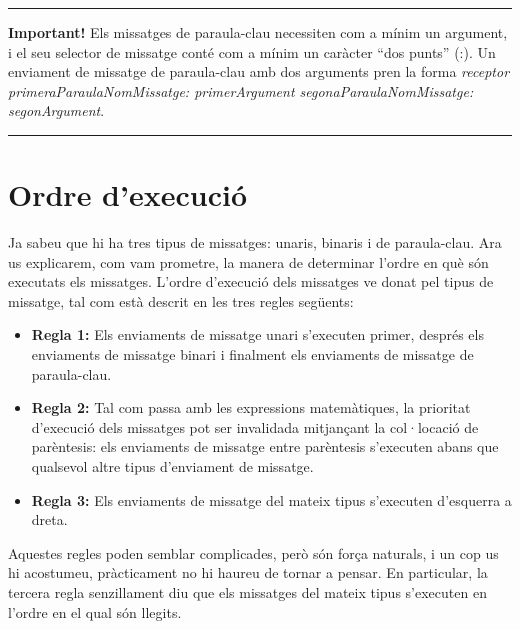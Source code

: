 \noindent
\rule{\textwidth}{2pt}
\noindent
\textbf{Important!} Els missatges de paraula-clau necessiten com a mínim un argument, i el seu selector de missatge conté com a mínim un caràcter ``dos punts'' (:). Un enviament de missatge de paraula-clau amb dos arguments pren la forma \textsf{{\itshape receptor primeraParaulaNomMissatge: primerArgument segonaParaulaNomMissatge: segonArgument}}.

\noindent
\rule{\textwidth}{2pt}

\section{Ordre d'execució}
Ja sabeu que hi ha tres tipus de missatges: unaris, binaris i de paraula-clau. Ara us explicarem, com vam prometre, la manera de determinar l'ordre en què són executats els missatges. L'ordre d'execució dels missatges ve donat pel tipus de missatge, tal com està descrit en les tres regles següents: 
\begin{itemize}
\item[] \textbf{Regla 1:} Els enviaments de missatge unari s'executen primer, després els enviaments de missatge binari i finalment els enviaments de missatge de paraula-clau.
\item[] \textbf{Regla 2:} Tal com passa amb les expressions matemàtiques, la prioritat d'execució dels missatges pot ser invalidada mitjançant la col·locació de parèntesis: els enviaments de missatge entre parèntesis s'executen abans que qualsevol altre tipus d'enviament de missatge.
\item[] \textbf{Regla 3:} Els enviaments de missatge del mateix tipus s'executen d'esquerra a dreta.
\end{itemize}

Aquestes regles poden semblar complicades, però són força naturals, i un cop us hi acostumeu, pràcticament no hi haureu de tornar a pensar. En particular, la tercera regla senzillament diu que els missatges del mateix tipus s'executen en l'ordre en el qual són llegits.

